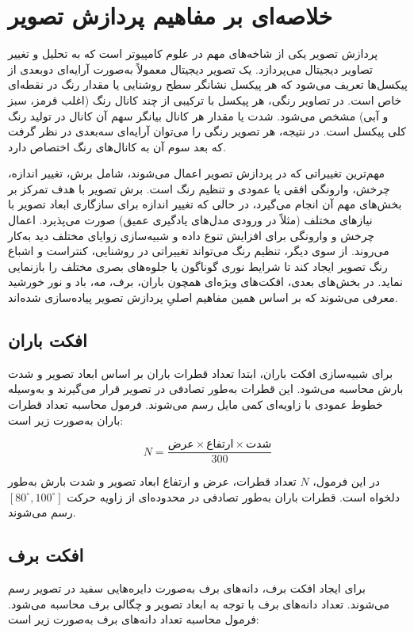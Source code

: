 \section{خلاصه‌ای بر مفاهیم پردازش تصویر}
پردازش تصویر یکی از شاخه‌های مهم در علوم کامپیوتر است که به تحلیل و تغییر تصاویر دیجیتال می‌پردازد. یک تصویر دیجیتال معمولاً به‌صورت آرایه‌ای دوبعدی از پیکسل‌ها تعریف می‌شود که هر پیکسل نشانگر سطح روشنایی یا مقدار رنگ در نقطه‌ای خاص است. در تصاویر رنگی، هر پیکسل با ترکیبی از چند کانال رنگ (اغلب قرمز، سبز و آبی) مشخص می‌شود. شدت یا مقدار هر کانال بیانگر سهم آن کانال در تولید رنگ کلی پیکسل است. در نتیجه، هر تصویر رنگی را می‌توان آرایه‌ای سه‌بعدی در نظر گرفت که بعد سوم آن به کانال‌های رنگ اختصاص دارد.

مهم‌ترین تغییراتی که در پردازش تصویر اعمال می‌شوند، شامل برش، تغییر اندازه، چرخش، وارونگی افقی یا عمودی و تنظیم رنگ است. برش تصویر با هدف تمرکز بر بخش‌های مهم آن انجام می‌گیرد، در حالی که تغییر اندازه برای سازگاری ابعاد تصویر با نیازهای مختلف (مثلاً در ورودی مدل‌های یادگیری عمیق) صورت می‌پذیرد. اعمال چرخش و وارونگی برای افزایش تنوع داده و شبیه‌سازی زوایای مختلف دید به‌کار می‌روند. از سوی دیگر، تنظیم رنگ می‌تواند تغییراتی در روشنایی، کنتراست و اشباع رنگ تصویر ایجاد کند تا شرایط نوری گوناگون یا جلوه‌های بصری مختلف را بازنمایی نماید. در بخش‌های بعدی، افکت‌های ویژه‌ای همچون باران، برف، مه، باد و نور خورشید معرفی می‌شوند که بر اساس همین مفاهیم اصلیِ پردازش تصویر پیاده‌سازی شده‌اند.


\subsection{افکت باران }
برای شبیه‌سازی افکت باران، ابتدا تعداد قطرات باران بر اساس ابعاد تصویر و شدت بارش محاسبه می‌شود. این قطرات به‌طور تصادفی در تصویر قرار می‌گیرند و به‌وسیله خطوط عمودی با زاویه‌ای کمی مایل رسم می‌شوند. فرمول محاسبه تعداد قطرات باران به‌صورت زیر است:

\[
N = \frac{{\text{عرض} \times \text{ارتفاع} \times \text{شدت}}}{300}
\]

در این فرمول، \( N \) تعداد قطرات، عرض و ارتفاع ابعاد تصویر و شدت بارش به‌طور دلخواه است. قطرات باران به‌طور تصادفی در محدوده‌ای از زاویه حرکت \(\left[80^\circ, 100^\circ\right]\) رسم می‌شوند.



\subsection{افکت برف }
برای ایجاد افکت برف، دانه‌های برف به‌صورت دایره‌هایی سفید در تصویر رسم می‌شوند. تعداد دانه‌های برف با توجه به ابعاد تصویر و چگالی برف محاسبه می‌شود. فرمول محاسبه تعداد دانه‌های برف به‌صورت زیر است:


